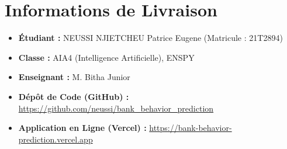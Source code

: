 \documentclass[12pt,a4paper]{article}
\begin{document}
\newpage
\section*{Informations de Livraison}
\begin{itemize}
    \item \textbf{Étudiant :} NEUSSI NJIETCHEU Patrice Eugene (Matricule : 21T2894)
    \item \textbf{Classe :} AIA4 (Intelligence Artificielle), ENSPY
    \item \textbf{Enseignant :} M. Bitha Junior
    \item \textbf{Dépôt de Code (GitHub) :} \url{https://github.com/neussi/bank_behavior_prediction}
    \item \textbf{Application en Ligne (Vercel) :} \url{https://bank-behavior-prediction.vercel.app}
\end{itemize}
\end{document}
